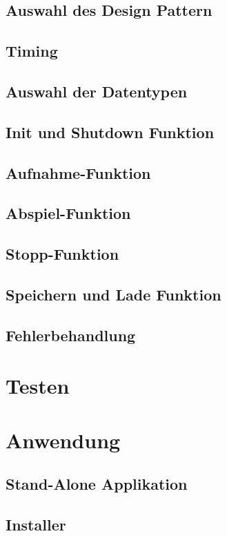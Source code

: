 		\subsection{Auswahl des Design Pattern} %
		\subsection{Timing}
		\subsection{Auswahl der Datentypen}

		\subsection{Init und Shutdown Funktion}	%
		\subsection{Aufnahme-Funktion}	
		\subsection{Abspiel-Funktion}
		\subsection{Stopp-Funktion}
		\subsection{Speichern und Lade Funktion}
			
		\subsection{Fehlerbehandlung}

\section{Testen}		

\section{Anwendung}
	\subsection{Stand-Alone Applikation}
	\subsection{Installer}
